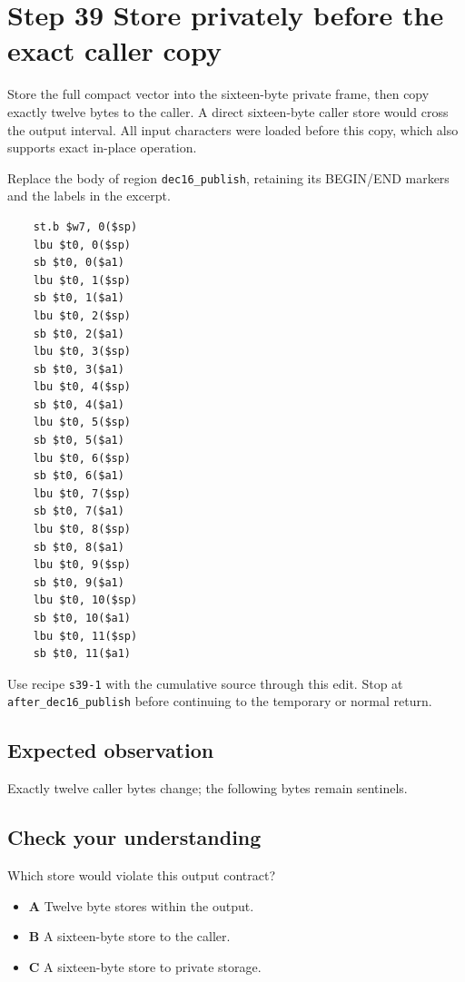 \section{Step 39 Store privately before the exact caller copy}\label{base64-s39}

Store the full compact vector into the sixteen-byte private frame, then copy exactly twelve bytes to the caller. A direct sixteen-byte caller store would cross the output interval. All input characters were loaded before this copy, which also supports exact in-place operation.

Replace the body of region \texttt{dec16\_publish}, retaining its BEGIN/END markers and the labels in the excerpt.

\begin{verbatim}
    st.b $w7, 0($sp)
    lbu $t0, 0($sp)
    sb $t0, 0($a1)
    lbu $t0, 1($sp)
    sb $t0, 1($a1)
    lbu $t0, 2($sp)
    sb $t0, 2($a1)
    lbu $t0, 3($sp)
    sb $t0, 3($a1)
    lbu $t0, 4($sp)
    sb $t0, 4($a1)
    lbu $t0, 5($sp)
    sb $t0, 5($a1)
    lbu $t0, 6($sp)
    sb $t0, 6($a1)
    lbu $t0, 7($sp)
    sb $t0, 7($a1)
    lbu $t0, 8($sp)
    sb $t0, 8($a1)
    lbu $t0, 9($sp)
    sb $t0, 9($a1)
    lbu $t0, 10($sp)
    sb $t0, 10($a1)
    lbu $t0, 11($sp)
    sb $t0, 11($a1)
\end{verbatim}

Use recipe \texttt{s39-1} with the cumulative source through this edit. Stop at \texttt{after\_dec16\_publish} before continuing to the temporary or normal return.

\subsection{Expected observation}
Exactly twelve caller bytes change; the following bytes remain sentinels.

\subsection{Check your understanding}
Which store would violate this output contract?

\begin{itemize}
  \item \textbf{A} Twelve byte stores within the output.
  \item \textbf{B} A sixteen-byte store to the caller.
  \item \textbf{C} A sixteen-byte store to private storage.
\end{itemize}
